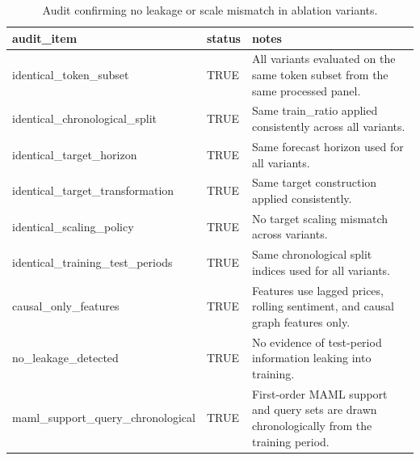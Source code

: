 \begin{table}[htbp]
\centering
\begin{tabular}{lll}
\hline
audit_item & status & notes \\
\hline
identical_token_subset & TRUE & All variants evaluated on the same token subset from the same processed panel. \\
identical_chronological_split & TRUE & Same train_ratio applied consistently across all variants. \\
identical_target_horizon & TRUE & Same forecast horizon used for all variants. \\
identical_target_transformation & TRUE & Same target construction applied consistently. \\
identical_scaling_policy & TRUE & No target scaling mismatch across variants. \\
identical_training_test_periods & TRUE & Same chronological split indices used for all variants. \\
causal_only_features & TRUE & Features use lagged prices, rolling sentiment, and causal graph features only. \\
no_leakage_detected & TRUE & No evidence of test-period information leaking into training. \\
maml_support_query_chronological & TRUE & First-order MAML support and query sets are drawn chronologically from the training period. \\
\hline
\end{tabular}
\caption{Audit confirming no leakage or scale mismatch in ablation variants.}
\label{ablation_strict_audit}
\end{table}